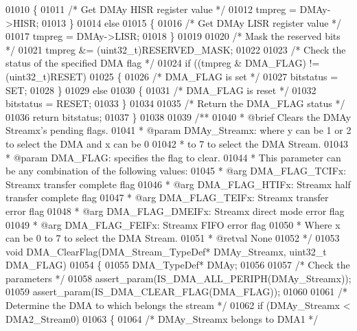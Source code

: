 \begin{DoxyCode}
01010   \{
01011     \textcolor{comment}{/* Get DMAy HISR register value */}
01012     tmpreg = DMAy->HISR;
01013   \}
01014   \textcolor{keywordflow}{else}
01015   \{
01016     \textcolor{comment}{/* Get DMAy LISR register value */}
01017     tmpreg = DMAy->LISR;
01018   \}
01019 
01020   \textcolor{comment}{/* Mask the reserved bits */}
01021   tmpreg &= (uint32\_t)RESERVED_MASK;
01022 
01023   \textcolor{comment}{/* Check the status of the specified DMA flag */}
01024   \textcolor{keywordflow}{if} ((tmpreg & DMA\_FLAG) != (uint32\_t)RESET)
01025   \{
01026     \textcolor{comment}{/* DMA\_FLAG is set */}
01027     bitstatus = SET;
01028   \}
01029   \textcolor{keywordflow}{else}
01030   \{
01031     \textcolor{comment}{/* DMA\_FLAG is reset */}
01032     bitstatus = RESET;
01033   \}
01034 
01035   \textcolor{comment}{/* Return the DMA\_FLAG status */}
01036   \textcolor{keywordflow}{return}  bitstatus;
01037 \}
01038 
01039 \textcolor{comment}{/**}
01040 \textcolor{comment}{  * @brief  Clears the DMAy Streamx's pending flags.}
01041 \textcolor{comment}{  * @param  DMAy\_Streamx: where y can be 1 or 2 to select the DMA and x can be 0}
01042 \textcolor{comment}{  *          to 7 to select the DMA Stream.}
01043 \textcolor{comment}{  * @param  DMA\_FLAG: specifies the flag to clear.}
01044 \textcolor{comment}{  *          This parameter can be any combination of the following values:}
01045 \textcolor{comment}{  *            @arg DMA\_FLAG\_TCIFx:  Streamx transfer complete flag}
01046 \textcolor{comment}{  *            @arg DMA\_FLAG\_HTIFx:  Streamx half transfer complete flag}
01047 \textcolor{comment}{  *            @arg DMA\_FLAG\_TEIFx:  Streamx transfer error flag}
01048 \textcolor{comment}{  *            @arg DMA\_FLAG\_DMEIFx: Streamx direct mode error flag}
01049 \textcolor{comment}{  *            @arg DMA\_FLAG\_FEIFx:  Streamx FIFO error flag}
01050 \textcolor{comment}{  *         Where x can be 0 to 7 to select the DMA Stream.   }
01051 \textcolor{comment}{  * @retval None}
01052 \textcolor{comment}{  */}
01053 \textcolor{keywordtype}{void} DMA_ClearFlag(DMA\_Stream\_TypeDef* DMAy\_Streamx, uint32\_t DMA\_FLAG)
01054 \{
01055   DMA\_TypeDef* DMAy;
01056 
01057   \textcolor{comment}{/* Check the parameters */}
01058   assert_param(IS\_DMA\_ALL\_PERIPH(DMAy\_Streamx));
01059   assert_param(IS\_DMA\_CLEAR\_FLAG(DMA\_FLAG));
01060 
01061   \textcolor{comment}{/* Determine the DMA to which belongs the stream */}
01062   \textcolor{keywordflow}{if} (DMAy\_Streamx < DMA2_Stream0)
01063   \{
01064     \textcolor{comment}{/* DMAy\_Streamx belongs to DMA1 */}

\end{DoxyCode}
